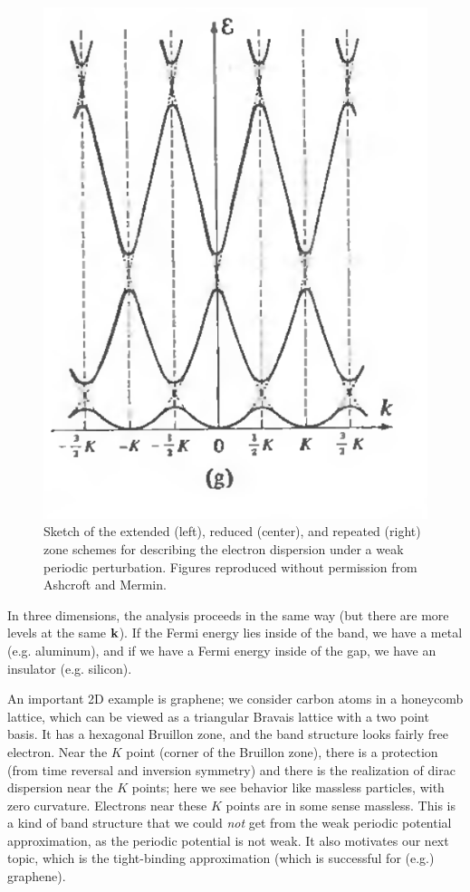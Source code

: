 \begin{figure}[htbp]
    \includegraphics[scale=0.5]{Images/fig-repeatedzonescheme.png}
    \caption{Sketch of the extended (left), reduced (center), and repeated (right) zone schemes for describing the electron dispersion under a weak periodic perturbation. Figures reproduced without permission from Ashcroft and Mermin.}
    \label{fig-extendedreducedrepeatedzoneschemes}
\end{figure}

In three dimensions, the analysis proceeds in the same way (but there are more levels at the same $\mathbf{k}$). If the Fermi energy lies inside of the band, we have a metal (e.g. aluminum), and if we have a Fermi energy inside of the gap, we have an insulator (e.g. silicon).

An important 2D example is graphene; we consider carbon atoms in a honeycomb lattice, which can be viewed as a triangular Bravais lattice with a two point basis. It has a hexagonal Bruillon zone, and the band structure looks fairly free electron. Near the $K$ point (corner of the Bruillon zone), there is a protection (from time reversal and inversion symmetry) and there is the realization of dirac dispersion near the $K$ points; here we see behavior like massless particles, with zero curvature. Electrons near these $K$ points are in some sense massless. This is a kind of band structure that we could \emph{not} get from the weak periodic potential approximation, as the periodic potential is not weak. It also motivates our next topic, which is the tight-binding approximation (which is successful for (e.g.) graphene).

